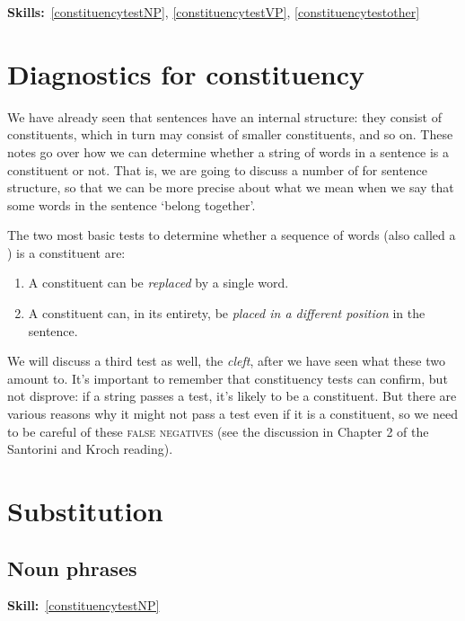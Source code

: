 \documentclass{article}
\begin{document}
\maketitle
\subtitle{Topic 2 Course Notes: Constituent Structure and Constituency Tests}
\hfill{}\textbf{Skills:}~\ref{constituencytestNP},
\ref{constituencytestVP},
\ref{constituencytestother}

\section{Diagnostics for constituency}

We have already seen that sentences have an internal structure: they consist of constituents, which in turn may consist of smaller constituents, and so on. 
These notes go over how we can determine whether a string of words in a sentence is a constituent or not.
That is, we are going to discuss a number of  for sentence structure, so that we can be more precise about what we mean when we say that some words in the sentence `belong together'.

The two most basic tests to determine whether a sequence of words (also called a ) is a constituent are:

\begin{enumerate}
	\item A constituent can be \emph{replaced} by a single word.
	\item A constituent can, in its entirety, be \emph{placed in a different position} in the sentence.
\end{enumerate}

We will discuss a third test as well, the \emph{cleft}, after we have seen what these two amount to. It's important to remember that constituency tests can confirm, but not disprove: if a string passes a test, it's likely to be a constituent. But there are various reasons why it might not pass a test even if it is a constituent, so we need to be careful of these \textsc{false negatives} (see the discussion in Chapter 2 of the Santorini and Kroch reading).

\section{Substitution}

\subsection{Noun phrases}
\hfill{}\textbf{Skill:}~\ref{constituencytestNP}
\end{document}
